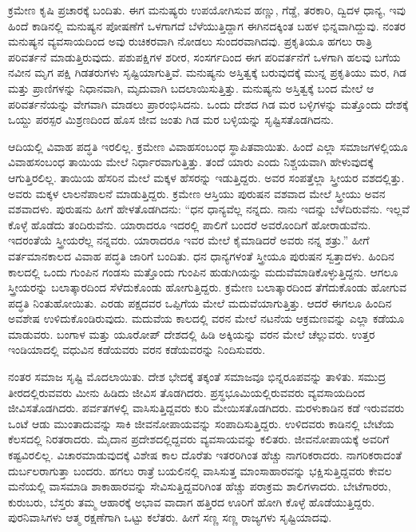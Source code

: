 \eject

ಕ್ರಮೇಣ ಕೃಷಿ ಪ್ರಚಾರಕ್ಕೆ ಬಂದಿತು. ಈಗ ಮನುಷ್ಯರು ಉಪಯೋಗಿಸುವ ಹಣ್ಣು, ಗೆಡ್ಡೆ, ತರಕಾರಿ, ದ್ವಿದಳ ಧಾನ್ಯ, ಇವು ಹಿಂದೆ ಕಾಡಿನಲ್ಲಿ ಮನುಷ್ಯನ ಪೋಷಣೆಗೆ ಒಳಗಾಗದೆ ಬೆಳೆಯುತ್ತಿದ್ದಾಗ ಈಗಿನದಕ್ಕಿಂತ ಬಹಳ ಭಿನ್ನವಾಗಿದ್ದುವು. ನಂತರ ಮನುಷ್ಯನ ವ್ಯವಸಾಯದಿಂದ ಅವು ರುಚಿಕರವಾಗಿ ನೋಡಲು ಸುಂದರವಾಗಿದವು. ಪ್ರಕೃತಿಯೂ ಹಗಲು ರಾತ್ರಿ ಪರಿವರ್ತನೆ ಮಾಡುತ್ತಿರುವುದು. ಪಶುಪಕ್ಷಿಗಳ ಶರೀರ, ಸಂಸರ್ಗದಿಂದ ಈಗ ಪರಿವರ್ತನೆಗೆ ಒಳಗಾಗಿ ಹಲವು ಬಗೆಯ ನವೀನ ಮೃಗ ಪಕ್ಷಿ ಗಿಡತರುಗಳು ಸೃಷ್ಟಿಯಾಗುತ್ತಿವೆ. ಮನುಷ್ಯನು ಅಸ್ತಿತ್ವಕ್ಕೆ ಬರುವುದಕ್ಕೆ ಮುನ್ನ ಪ್ರಕೃತಿಯು ಮರ, ಗಿಡ ಮತ್ತು ಪ್ರಾಣಿಗಳನ್ನು ನಿಧಾನವಾಗಿ, ಮೃದುವಾಗಿ ಬದಲಾಯಿಸುತ್ತಿತ್ತು. ಮನುಷ್ಯನು ಅಸ್ತಿತ್ವಕ್ಕೆ ಬಂದ ಮೇಲೆ ಆ ಪರಿವರ್ತನೆಯನ್ನು ವೇಗವಾಗಿ ಮಾಡಲು ಪ್ರಾರಂಭಿಸಿದನು. ಒಂದು ದೇಶದ ಗಿಡ ಮರ ಬಳ್ಳಿಗಳನ್ನು ಮತ್ತೊಂದು ದೇಶಕ್ಕೆ ಒಯ್ದು ಪರಸ್ಪರ ಮಿಶ್ರಣದಿಂದ ಹೊಸ ಜೀವ ಜಂತು ಗಿಡ ಮರ ಬಳ್ಳಿಯನ್ನು ಸೃಷ್ಟಿಸತೊಡಗಿದನು.

\vskip 6pt

ಆದಿಯಲ್ಲಿ ವಿವಾಹ ಪದ್ಧತಿ ಇರಲಿಲ್ಲ. ಕ್ರಮೇಣ ವಿವಾಹಸಂಬಂಧ ಸ್ಥಾಪಿತವಾಯಿತು. ಹಿಂದೆ ಎಲ್ಲಾ ಸಮಾಜಗಳಲ್ಲಿಯೂ ವಿವಾಹಸಂಬಂಧ ತಾಯಿಯ ಮೇಲೆ ನಿರ್ಧಾರವಾಗು\break ತ್ತಿತ್ತು. ತಂದೆ ಯಾರು ಎಂದು ನಿಶ್ಚಯವಾಗಿ ಹೇಳುವುದಕ್ಕೆ ಆಗುತ್ತಿರಲಿಲ್ಲ. ತಾಯಿಯ ಹೆಸರಿನ ಮೇಲೆ ಮಕ್ಕಳ ಹೆಸರನ್ನು ಇಡುತ್ತಿದ್ದರು. ಅವರ ಸಂಪತ್ತೆಲ್ಲಾ ಸ್ತ್ರೀಯರ ವಶದಲ್ಲಿತ್ತು. ಅವರು ಮಕ್ಕಳ ಲಾಲನೆಪಾಲನೆ ಮಾಡುತ್ತಿದ್ದರು. ಕ್ರಮೇಣ ಆಸ್ತಿಯು ಪುರುಷನ ವಶವಾದ ಮೇಲೆ ಸ್ತ್ರೀಯು ಅವನ ವಶವಾದಳು. ಪುರುಷನು ಹೀಗೆ ಹೇಳತೊಡಗಿದನು: “ಧನ ಧಾನ್ಯವೆಲ್ಲ ನನ್ನದು. ನಾನು ಇದನ್ನು ಬೆಳೆದಿರುವೆನು. ಇಲ್ಲವೆ ಕೊಳ್ಳೆ ಹೊಡೆದು ತಂದಿರು\break ವೆನು. ಯಾರಾದರೂ ಇದರಲ್ಲಿ ಪಾಲಿಗೆ ಬಂದರೆ ಅವರೊಂದಿಗೆ ಹೋರಾಡುವೆನು. ಇದರಂತೆಯೆ ಸ್ತ್ರೀಯರೆಲ್ಲ ನನ್ನವರು. ಯಾರಾದರೂ ಇವರ ಮೇಲೆ ಕೈಮಾಡಿದರೆ ಅವರು ನನ್ನ ಶತ್ರು.” ಹೀಗೆ ವರ್ತಮಾನಕಾಲದ ವಿವಾಹ ಪದ್ಧತಿ ಜಾರಿಗೆ ಬಂದಿತು. ಧನ ಧಾನ್ಯಗಳಂತೆ ಸ್ತ್ರೀಯೂ ಪುರುಷನ ಸ್ವತ್ತಾದಳು. ಹಿಂದಿನ ಕಾಲದಲ್ಲಿ ಒಂದು ಗುಂಪಿನ ಗಂಡಸು ಮತ್ತೊಂದು ಗುಂಪಿನ ಹುಡುಗಿಯನ್ನು ಮದುವೆಮಾಡಿಕೊಳ್ಳುತ್ತಿದ್ದನು. ಆಗಲೂ ಸ್ತ್ರೀಯರನ್ನು ಬಲಾತ್ಕಾರದಿಂದ ಸೆಳೆದುಕೊಂಡು ಹೋಗುತ್ತಿದ್ದರು. ಕ್ರಮೇಣ ಬಲಾತ್ಕಾರದಿಂದ ತೆಗೆದುಕೊಂಡು ಹೋಗುವ ಪದ್ಧತಿ ನಿಂತುಹೋಯಿತು. ಎರಡು ಪಕ್ಷದವರ ಒಪ್ಪಿಗೆಯ ಮೇಲೆ ಮದುವೆಯಾಗುತ್ತಿತ್ತು. ಆದರೆ ಈಗಲೂ ಹಿಂದಿನ ಅವಶೇಷ ಉಳಿದು\break ಕೊಂಡಿರುವುದು. ಮದುವೆಯ ಕಾಲದಲ್ಲಿ ವರನ ಮೇಲೆ ನಟನೆಯ ಆಕ್ರಮಣವನ್ನು ಎಲ್ಲಾ ಕಡೆಯೂ ಮಾಡುವರು. ಬಂಗಾಳ ಮತ್ತು ಯೂರೋಪ್​ ದೇಶದಲ್ಲಿ ಹಿಡಿ ಅಕ್ಕಿಯನ್ನು ವರನ ಮೇಲೆ ಚೆಲ್ಲುವರು. ಉತ್ತರ ಇಂಡಿಯಾದಲ್ಲಿ ವಧುವಿನ ಕಡೆಯವರು ವರನ ಕಡೆಯವರನ್ನು ನಿಂದಿಸುವರು.

\eject

ನಂತರ ಸಮಾಜ ಸೃಷ್ಟಿ ಮೊದಲಾಯಿತು. ದೇಶ ಭೇದಕ್ಕೆ ತಕ್ಕಂತೆ ಸಮಾಜವೂ ಭಿನ್ನರೂಪವನ್ನು ತಾಳಿತು. ಸಮುದ್ರ ತೀರದಲ್ಲಿರುವವರು ಮೀನು ಹಿಡಿದು ಜೀವಿಸ ತೊಡಗಿದರು. ಪ್ರಸ್ಥಭೂಮಿಯಲ್ಲಿರುವವರು ವ್ಯವಸಾಯದಿಂದ ಜೀವಿಸತೊಡಗಿದರು. ಪರ್ವತಗಳಲ್ಲಿ ವಾಸಿಸುತ್ತಿದ್ದವರು ಕುರಿ ಮೇಯಿಸತೊಡಗಿದರು. ಮರಳುಕಾಡಿನ ಕಡೆ ಇರುವವರು ಒಂಟೆ ಆಡು ಮುಂತಾದುವನ್ನು ಸಾಕಿ ಜೀವನೋಪಾಯವನ್ನು ಸಂಪಾದಿಸುತ್ತಿದ್ದರು. ಉಳಿದವರು ಕಾಡಿನಲ್ಲಿ ಬೇಟೆಯ ಕೆಲಸದಲ್ಲಿ ನಿರತರಾದರು. ಮೈದಾನ ಪ್ರದೇಶದಲ್ಲಿದ್ದವರು ವ್ಯವಸಾಯವನ್ನು ಕಲಿತರು. ಜೀವನೋಪಾಯಕ್ಕೆ ಅವರಿಗೆ ಕಷ್ಟವಿರಲಿಲ್ಲ. ವಿಚಾರಮಾಡುವು\break ದಕ್ಕೆ ವಿಶೇಷ ಕಾಲ ದೊರೆತು ಇತರರಿಗಿಂತ ಹೆಚ್ಚು ನಾಗರಿಕರಾದರು. ನಾಗರಿಕರಾದಂತೆ ದುರ್ಬಲರಾಗುತ್ತಾ ಬಂದರು. ಹಗಲು ರಾತ್ರೆ ಬಯಲಿನಲ್ಲಿ ವಾಸಿಸುತ್ತ ಮಾಂಸಾಹಾರವನ್ನು ಭಕ್ಷಿಸುತ್ತಿದ್ದವರು ಕೇವಲ ಮನೆಯಲ್ಲಿ ವಾಸಮಾಡಿ ಶಾಕಾಹಾರವನ್ನು ಸೇವಿಸುತ್ತಿದ್ದವರಿಗಿಂತ ಹೆಚ್ಚು ಪರಾಕ್ರಮ ಶಾಲಿಗಳಾದರು. ಬೇಟೆಗಾರರು, ಕುರುಬರು, ಬೆಸ್ತರು ತಮ್ಮ ಆಹಾರಕ್ಕೆ ಅಭಾವ ವಾದಾಗ ಹತ್ತಿರದ ಊರಿಗೆ ಹೋಗಿ ಕೊಳ್ಳೆ ಹೊಡೆಯುತ್ತಿದ್ದರು. ಪುರನಿವಾಸಿಗಳು ಆತ್ಮ ರಕ್ಷಣೆಗಾಗಿ ಒಟ್ಟು ಕಲೆತರು. ಹೀಗೆ ಸಣ್ಣ ಸಣ್ಣ ರಾಜ್ಯಗಳು ಸೃಷ್ಟಿಯಾದವು.

